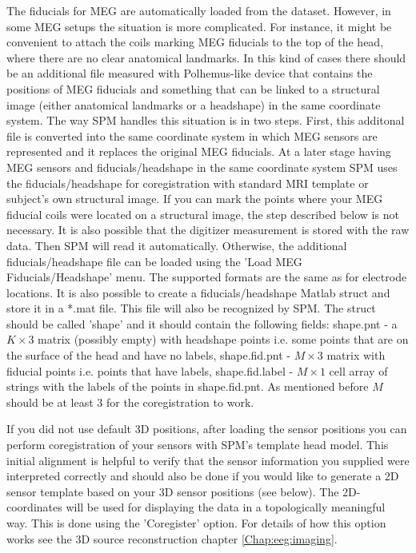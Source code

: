The fiducials for MEG are automatically loaded from the dataset. However, in some
MEG setups the situation is more complicated. For instance, it might be convenient 
to attach the coils marking MEG fiducials to the top of the head, where there are no
clear anatomical landmarks. In this kind of cases there should be an additional file measured with Polhemus-like
device that contains the positions of MEG fiducials and something that can be linked to a structural
image (either anatomical landmarks or a headshape) in the same coordinate system. The way SPM
handles this situation is in two steps. First, this additonal file is converted into the same
coordinate system in which MEG sensors are represented and it replaces the original MEG fiducials.
At a later stage having MEG sensors and fiducials/headshape in the same coordinate system SPM
uses the fiducials/headshape for coregistration with standard MRI template or subject's own structural image. 
If you can mark the points where your MEG fiducial coils were located on a structural image, the step
described below is not necessary. It is also possible that the digitizer measurement is stored with the
raw data. Then SPM will read it automatically. Otherwise, the additional fiducials/headshape file can be loaded
using the 'Load MEG Fiducials/Headshape' menu. The supported formats are the same as for electrode locations.
It is also possible to create a fiducials/headshape Matlab struct and store it in a *.mat file. This file will
also be recognized by SPM. The struct should be called 'shape' and it should contain the following fields:
shape.pnt - a $K \times 3$ matrix (possibly empty) with headshape points i.e. some points that are on the surface of the head
and have no labels, shape.fid.pnt - $M \times 3$ matrix with fiducial points i.e. points that have labels,
shape.fid.label - $M \times 1$ cell array of strings with the labels of the points in shape.fid.pnt. As mentioned
before $M$ should be at least 3 for the coregistration to work. 

If you did not use default 3D positions, after loading the sensor
positions you can perform coregistration of your sensors with SPM's
template head model. This initial alignment is helpful to verify that
the sensor information you supplied were interpreted correctly and
should also be done if you would like to generate a 2D sensor template
based on your 3D sensor positions (see below). The 2D-coordinates will
be used for displaying the data in a topologically meaningful way. This
is done using the 'Coregister' option. For details of how this option works
see the 3D source reconstruction chapter \ref{Chap:eeg:imaging}. 

